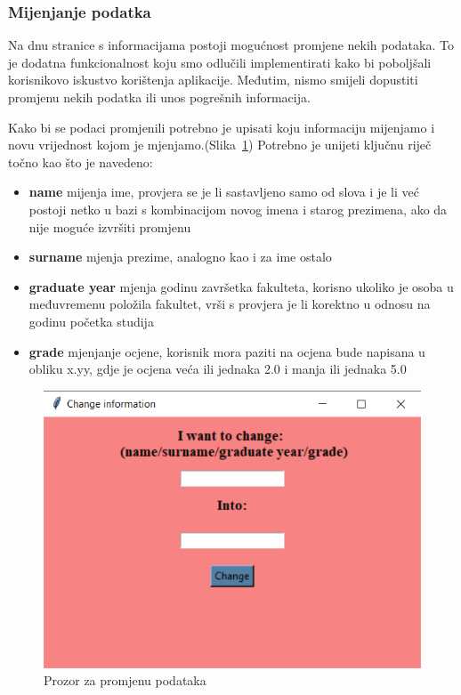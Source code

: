 \documentclass[titlepage, 12pt]{scrartcl}
\begin{document}
	\subsubsection{Mijenjanje podatka}
	
	Na dnu stranice s informacijama postoji mogućnost promjene nekih podataka. To je dodatna funkcionalnost koju smo odlučili implementirati kako bi poboljšali korisnikovo iskustvo korištenja aplikacije. Međutim, nismo smijeli dopustiti promjenu nekih podatka ili unos pogrešnih informacija.  
	
    Kako bi se podaci promjenili potrebno je upisati koju informaciju mijenjamo i novu vrijednost kojom je mjenjamo.(Slika~\ref{fig:change}) Potrebno je unijeti ključnu riječ točno kao što je navedeno:
	\begin{samepage}
		
		
		\begin{itemize}
			\item \textbf{name} mijenja ime, provjera se je li sastavljeno samo od slova i je li već postoji netko u bazi s kombinacijom novog imena i starog prezimena, ako da nije moguće izvršiti promjenu
			\item \textbf{surname} mjenja prezime, analogno kao i za ime ostalo
			\item \textbf{graduate year} mjenja godinu završetka fakulteta, korisno ukoliko je osoba u međuvremenu položila fakultet, vrši s provjera je li korektno u odnosu na godinu početka studija
			\item \textbf{grade} mjenjanje ocjene, korisnik mora paziti na ocjena bude napisana u obliku x.yy, gdje je ocjena veća ili jednaka 2.0 i manja ili jednaka 5.0 
		\end{itemize}
	\end{samepage}
	
	\begin{figure}
		\begin{center}
			\includegraphics[scale=0.9]{slike/change.png}
			\caption{Prozor za promjenu podataka}
			\label{fig:change} 
		\end{center}
	\end{figure}
	
\end{document}
